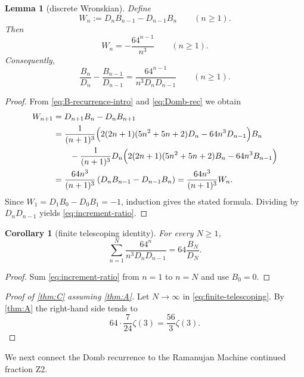 \documentclass[11pt]{amsart}
\newtheorem{lemma}[theorem]{Lemma}
\newtheorem{corollary}[theorem]{Corollary}
\theoremstyle{definition}
\theoremstyle{remark}
\begin{document}
\begin{lemma}[discrete Wronskian]\label{lem:wronskian}
Define
\[
W_n:=D_nB_{n-1}-D_{n-1}B_n\qquad(n\ge 1).
\]
Then
\[
W_n=-\frac{64^{n-1}}{n^3}\qquad(n\ge 1).
\]
Consequently,
\begin{equation}\label{eq:increment-ratio}
\frac{B_n}{D_n}-\frac{B_{n-1}}{D_{n-1}}=\frac{64^{n-1}}{n^3D_nD_{n-1}}
\qquad(n\ge 1).
\end{equation}
\end{lemma}

\begin{proof}
From \eqref{eq:B-recurrence-intro} and \eqref{eq:Domb-rec} we obtain
\begin{align*}
W_{n+1}
&=D_{n+1}B_n-D_nB_{n+1}\\
&=\frac{1}{(n+1)^3}\Bigl(2(2n+1)(5n^2+5n+2)D_n-64n^3D_{n-1}\Bigr)B_n\\
&\qquad -\frac{1}{(n+1)^3}D_n\Bigl(2(2n+1)(5n^2+5n+2)B_n-64n^3B_{n-1}\Bigr)\\
&=\frac{64n^3}{(n+1)^3}\,(D_nB_{n-1}-D_{n-1}B_n)
=\frac{64n^3}{(n+1)^3}W_n.
\end{align*}
Since $W_1=D_1B_0-D_0B_1=-1$, induction gives the stated formula. Dividing by $D_nD_{n-1}$ yields \eqref{eq:increment-ratio}.
\end{proof}

\begin{corollary}[finite telescoping identity]\label{cor:telescoping}
For every $N\ge 1$,
\begin{equation}\label{eq:finite-telescoping}
\sum_{n=1}^N\frac{64^n}{n^3D_nD_{n-1}}=64\frac{B_N}{D_N}.
\end{equation}
\end{corollary}

\begin{proof}
Sum \eqref{eq:increment-ratio} from $n=1$ to $n=N$ and use $B_0=0$.
\end{proof}

\begin{proof}[Proof of \cref{thm:C} assuming \cref{thm:A}]
Let $N\to\infty$ in \eqref{eq:finite-telescoping}. By \cref{thm:A} the right-hand side tends to
\[
64\cdot \frac{7}{24}\zeta(3)=\frac{56}{3}\zeta(3).
\]
\end{proof}

We next connect the Domb recurrence to the Ramanujan Machine continued fraction Z2.
\end{document}
